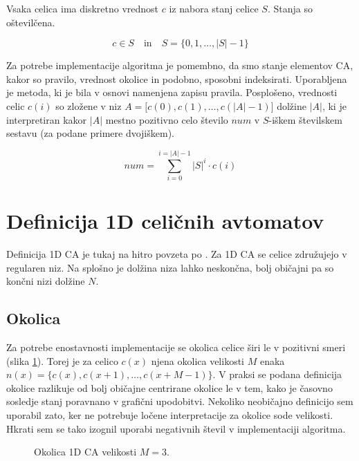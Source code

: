 \documentclass[12pt,a4paper,openany,twoside]{book}
\begin{document}
Vsaka celica ima diskretno vrednost \(c\) iz nabora stanj celice \(S\).
Stanja so oštevilčena.

\begin{equation}
c \in S
\quad \textrm{in} \quad
S = \{ 0, 1, \ldots, |S|-1 \}
\end{equation}

Za potrebe implementacije algoritma je pomembno,
da smo stanje elementov CA, kakor so pravilo, vrednost okolice in podobno,
sposobni indeksirati.
Uporabljena je metoda, ki je bila v osnovi namenjena zapisu pravila.
Posplošeno, vrednosti celic \(c(i)\) so zložene v niz \(A=[c(0),c(1), \ldots, c(|A|-1)\)] dolžine \(|A|\),
ki je interpretiran kakor \(|A|\) mestno pozitivno celo število \(num\) v
\(S\)-iškem številskem sestavu (za podane primere dvojiškem).

\begin{equation}
num = \sum_{i=0}^{i=|A|-1} |S|^i \cdot c(i)
\end{equation}

\section{Definicija 1D celičnih avtomatov}

Definicija 1D CA je tukaj na hitro povzeta po \cite{JerasDobnikar2007}.
Za 1D CA se celice združujejo v regularen niz.
Na splošno je dolžina niza lahko neskončna,
bolj običajni pa so končni nizi dolžine \(N\).

\subsection{Okolica}

Za potrebe enostavnosti implementacije se okolica celice širi le v pozitivni smeri (slika \ref{neighborhood_1d}).
Torej je za celico \(c(x)\) njena okolica velikosti \(M\) enaka
\(n(x) = \{c(x), c(x+1), \ldots, c(x+M-1)\}\).
V praksi se podana definicija okolice razlikuje od
bolj običajne centrirane okolice le v tem,
kako je časovno sosledje stanj poravnano v grafični upodobitvi.
Nekoliko neobičajno definicijo sem uporabil zato,
ker ne potrebuje ločene interpretacije za okolice sode velikosti.
Hkrati sem se tako izognil uporabi negativnih števil v implementaciji algoritma.

\begin{figure}[htb]
\centerline{}
\caption[Okolica 1D CA.]{Okolica 1D CA velikosti \(M=3\).}
\label{neighborhood_1d}
\end{figure}
\vspace{5mm}
\end{document}
